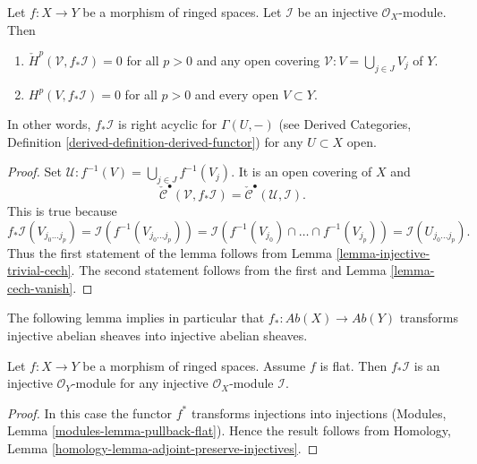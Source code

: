 \begin{lemma}
\label{lemma-pushforward-injective}
Let $f : X \to Y$ be a morphism of ringed spaces.
Let $\mathcal{I}$ be an injective $\mathcal{O}_X$-module.
Then
\begin{enumerate}
\item $\check{H}^p(\mathcal{V}, f_*\mathcal{I}) = 0$
for all $p > 0$ and any open covering
$\mathcal{V} : V = \bigcup_{j \in J} V_j$ of $Y$.
\item $H^p(V, f_*\mathcal{I}) = 0$ for all $p > 0$ and
every open $V \subset Y$.
\end{enumerate}
In other words, $f_*\mathcal{I}$ is right acyclic for $\Gamma(U, -)$
(see
Derived Categories, Definition \ref{derived-definition-derived-functor})
for any $U \subset X$ open.
\end{lemma}

\begin{proof}
Set $\mathcal{U} : f^{-1}(V) = \bigcup_{j \in J} f^{-1}(V_j)$.
It is an open covering of $X$ and
$$
\check{\mathcal{C}}^\bullet(\mathcal{V}, f_*\mathcal{I}) =
\check{\mathcal{C}}^\bullet(\mathcal{U}, \mathcal{I}).
$$
This is true because
$$
f_*\mathcal{I}(V_{j_0 \ldots j_p})
= \mathcal{I}(f^{-1}(V_{j_0 \ldots j_p})) =
\mathcal{I}(f^{-1}(V_{j_0}) \cap \ldots \cap f^{-1}(V_{j_p}))
= \mathcal{I}(U_{j_0 \ldots j_p}).
$$
Thus the first statement of the lemma follows from
Lemma \ref{lemma-injective-trivial-cech}. The second statement
follows from the first and Lemma \ref{lemma-cech-vanish}.
\end{proof}

\noindent
The following lemma implies in particular that
$f_* : \textit{Ab}(X) \to \textit{Ab}(Y)$ transforms injective
abelian sheaves into injective abelian sheaves.

\begin{lemma}
\label{lemma-pushforward-injective-flat}
Let $f : X \to Y$ be a morphism of ringed spaces.
Assume $f$ is flat.
Then $f_*\mathcal{I}$ is an injective $\mathcal{O}_Y$-module
for any injective $\mathcal{O}_X$-module $\mathcal{I}$.
\end{lemma}

\begin{proof}
In this case the functor $f^*$ transforms injections into injections
(Modules, Lemma \ref{modules-lemma-pullback-flat}).
Hence the result follows from
Homology, Lemma \ref{homology-lemma-adjoint-preserve-injectives}.
\end{proof}






